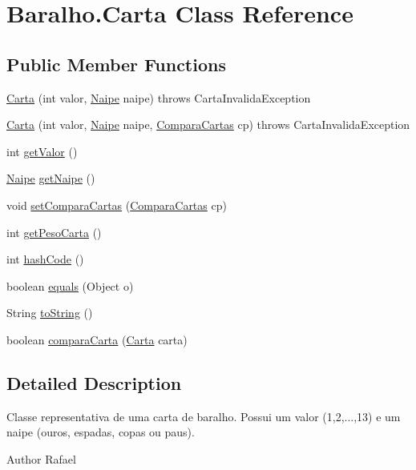 \hypertarget{class_baralho_1_1_carta}{
\section{\-Baralho.\-Carta \-Class \-Reference}
\label{class_baralho_1_1_carta}
}
\subsection*{\-Public \-Member \-Functions}
\begin{DoxyCompactItemize}
\item 
\hyperlink{class_baralho_1_1_carta_a0112885d7f19cccbe902005855eaf417}{\-Carta} (int valor, \hyperlink{namespace_baralho_ab887857dcb81ef6672322ce80039b905}{\-Naipe} naipe)  throws Carta\-Invalida\-Exception
\item 
\hyperlink{class_baralho_1_1_carta_ab6f4c7de7f418095d9bad9587c457bea}{\-Carta} (int valor, \hyperlink{namespace_baralho_ab887857dcb81ef6672322ce80039b905}{\-Naipe} naipe, \hyperlink{interface_baralho_1_1_compara_cartas}{\-Compara\-Cartas} cp)  throws Carta\-Invalida\-Exception
\item 
int \hyperlink{class_baralho_1_1_carta_a8cd63f6e252c1193bf10ec877f6982f8}{get\-Valor} ()
\item 
\hyperlink{namespace_baralho_ab887857dcb81ef6672322ce80039b905}{\-Naipe} \hyperlink{class_baralho_1_1_carta_a327a805c7a73b5dce6538fd3f4c7f4ae}{get\-Naipe} ()
\item 
void \hyperlink{class_baralho_1_1_carta_a05361c159805fb0ad54f7b6a3d358019}{set\-Compara\-Cartas} (\hyperlink{interface_baralho_1_1_compara_cartas}{\-Compara\-Cartas} cp)
\item 
int \hyperlink{class_baralho_1_1_carta_a7bc607ded2e593d2230c4cb0fb35b9d3}{get\-Peso\-Carta} ()
\item 
int \hyperlink{class_baralho_1_1_carta_a922703c5ca6a4c0aa2e7b50e5e0522b4}{hash\-Code} ()
\item 
boolean \hyperlink{class_baralho_1_1_carta_a834eb141943c980aa1c2d78c3c3a8541}{equals} (\-Object o)
\item 
\-String \hyperlink{class_baralho_1_1_carta_afd20dd3fad21790f281563e600ba7fe0}{to\-String} ()
\item 
boolean \hyperlink{class_baralho_1_1_carta_ab96ae30df37af13cb0ab42dcebd02f3e}{compara\-Carta} (\hyperlink{class_baralho_1_1_carta}{\-Carta} carta)
\end{DoxyCompactItemize}


\subsection{\-Detailed \-Description}
\-Classe representativa de uma carta de baralho. \-Possui um valor (1,2,...,13) e um naipe (ouros, espadas, copas ou paus). \begin{DoxyAuthor}{\-Author}
\-Rafael 
\end{DoxyAuthor}


